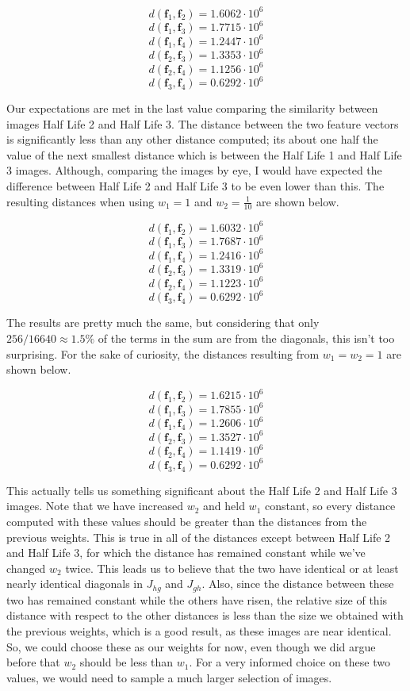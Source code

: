 \documentclass[11 pt]{article}
\begin{document}
$$d(\mathbf{f}_1,\mathbf{f}_2) = 1.6062\cdot 10^6$$
$$d(\mathbf{f}_1,\mathbf{f}_3) = 1.7715\cdot 10^6$$
$$d(\mathbf{f}_1,\mathbf{f}_4) = 1.2447\cdot 10^6$$
$$d(\mathbf{f}_2,\mathbf{f}_3) = 1.3353\cdot 10^6$$
$$d(\mathbf{f}_2,\mathbf{f}_4) = 1.1256\cdot 10^6$$
$$d(\mathbf{f}_3,\mathbf{f}_4) = 0.6292\cdot 10^6$$

Our expectations are met in the last value comparing the similarity between images Half Life 2 and Half Life 3. The distance between the two feature vectors is significantly less than any other distance computed; its about one half the value of the next smallest distance which is between the Half Life 1 and Half Life 3 images. Although, comparing the images by eye, I would have expected the difference between Half Life 2 and Half Life 3 to be even lower than this. The resulting distances when using $w_1=1$ and $w_2=\frac{1}{10}$ are shown below.

$$d(\mathbf{f}_1,\mathbf{f}_2) = 1.6032\cdot 10^6$$
$$d(\mathbf{f}_1,\mathbf{f}_3) = 1.7687\cdot 10^6$$
$$d(\mathbf{f}_1,\mathbf{f}_4) = 1.2416\cdot 10^6$$
$$d(\mathbf{f}_2,\mathbf{f}_3) = 1.3319\cdot 10^6$$
$$d(\mathbf{f}_2,\mathbf{f}_4) = 1.1223\cdot 10^6$$
$$d(\mathbf{f}_3,\mathbf{f}_4) = 0.6292\cdot 10^6$$

The results are pretty much the same, but considering that only $256/16640\approx 1.5\%$ of the terms in the sum are from the diagonals, this isn't too surprising. For the sake of curiosity, the distances resulting from $w_1=w_2=1$ are shown below.

$$d(\mathbf{f}_1,\mathbf{f}_2) = 1.6215\cdot 10^6$$
$$d(\mathbf{f}_1,\mathbf{f}_3) = 1.7855\cdot 10^6$$
$$d(\mathbf{f}_1,\mathbf{f}_4) = 1.2606\cdot 10^6$$
$$d(\mathbf{f}_2,\mathbf{f}_3) = 1.3527\cdot 10^6$$
$$d(\mathbf{f}_2,\mathbf{f}_4) = 1.1419\cdot 10^6$$
$$d(\mathbf{f}_3,\mathbf{f}_4) = 0.6292\cdot 10^6$$

This actually tells us something significant about the Half Life 2 and Half Life 3 images. Note that we have increased $w_2$ and held $w_1$ constant, so every distance computed with these values should be greater than the distances from the previous weights. This is true in all of the distances except between Half Life 2 and Half Life 3, for which the distance has remained constant while we've changed $w_2$ twice. This leads us to believe that the two have identical or at least nearly identical diagonals in $J_{hg}$ and $J_{gh}$. Also, since the distance between these two has remained constant while the others have risen, the relative size of this distance with respect to the other distances is less than the size we obtained with the previous weights, which is a good result, as these images are near identical. So, we could choose these as our weights for now, even though we did argue before that $w_2$ should be less than $w_1$. For a very informed choice on these two values, we would need to sample a much larger selection of images.
\end{document}
